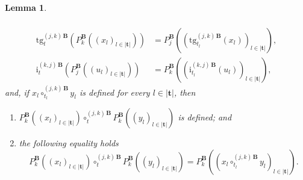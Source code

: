 \documentclass[a4paper, reqno]{amsbook}
\newcommand{\bb}[1]{\ensuremath{\lvert #1 \rvert}}
\newcommand{\tgt}{\mathrm{tg}}
\theoremstyle{plain}
\newtheorem{lemma}[theorem]{Lemma}
\theoremstyle{definition}
\begin{document}
\begin{lemma}
\begin{enumerate}
\begin{align*}
\\
\tgt^{(j,k)\,\mathbf{B}}_{t}\left(P_{k}^{\mathbf{B}}\left((x_{l})_{l\in\bb{\mathbf{t}}}\right)\right)&=P_{j}^{\mathbf{B}}\left(\left(\tgt^{(j,k)\,\mathbf{B}}_{t_{l}}(x_{l})\right)_{l\in\bb{\mathbf{t}}}\right),
\\
\mathrm{i}^{(k,j)\,\mathbf{B}}_{t}\left(P_{j}^{\mathbf{B}}\left((u_{l})_{l\in\bb{\mathbf{t}}}\right)\right)&=P_{k}^{\mathbf{B}}\left(\left(\mathrm{i}^{(k,j)\,\mathbf{B}}_{t_{l}}(u_{l})\right)_{l\in\bb{\mathbf{t}}}\right),
\end{align*}
and, if $x_{l}\circ^{(j,k)\,\mathbf{B}}_{t_{l}}y_{l}$ is defined for every $l\in\bb{\mathbf{t}}$, then
\begin{enumerate}
\item $P_{k}^{\mathbf{B}}((x_{l})_{l\in\bb{\mathbf{t}}})\circ^{(j,k)\,\mathbf{B}}_{t}P_{k}^{\mathbf{B}}((y_{l})_{l\in\bb{\mathbf{t}}})$ is defined; and
\item the following equality holds
$$
P_{k}^{\mathbf{B}}\left((x_{l})_{l\in\bb{\mathbf{t}}}\right)\circ^{(j,k)\,\mathbf{B}}_{t}P_{k}^{\mathbf{B}}\left((y_{l})_{l\in\bb{\mathbf{t}}}\right)=P_{k}^{\mathbf{B}}\left(\left(x_{l}\circ^{(j,k)\,\mathbf{B}}_{t_{l}}y_{l}\right)_{l\in\bb{\mathbf{t}}}\right).
$$
\end{enumerate}
\end{enumerate}
\end{lemma}
\end{document}
